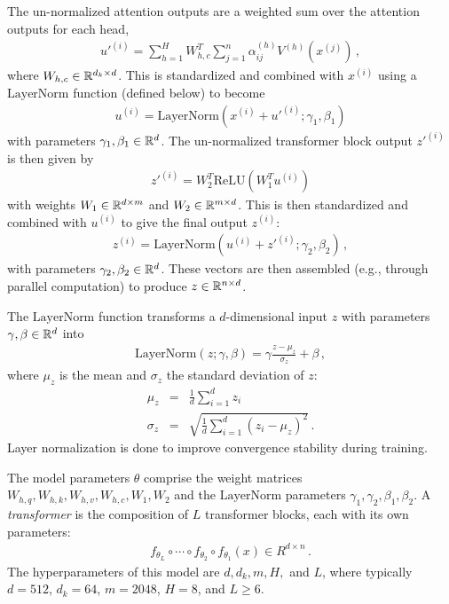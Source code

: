 The un-normalized attention outputs are a weighted sum over the attention outputs for each head,
\begin{eqnarray}
  {u'}^{(i)} = \sum_{h=1}^H W^T_{h,c} \sum_{j=1}^{n} \alpha^{(h)}_{ij} V^{(h)}(x^{(j)})
\,,
\end{eqnarray}
where $W_{h,c} \in \mathbb{R}^{d_k\times d}$.  This is standardized and combined with $x^{(i)}$ using a $\text{LayerNorm}$ function (defined below) to become
\begin{eqnarray}
  {u}^{(i)} = \text{LayerNorm}\left(  x^{(i)} + {u'}^{(i)}; \gamma_1, \beta_1  \right)
\end{eqnarray}
with parameters $\gamma_1, \beta_1 \in \mathbb{R}^{d}$.  The un-normalized transformer block output ${z'}^{(i)}$ is then given by
\begin{eqnarray}
  {z'}^{(i)} = W_2^T \text{ReLU}\left( W_1^T u^{(i)} \right)
\end{eqnarray}
with weights $W_1\in \mathbb{R}^{d\times m}$ and $W_2\in \mathbb{R}^{m\times d}$.  This is then standardized and combined with $u^{(i)}$ to give the final output $z^{(i)}$:
\begin{eqnarray}
  {z}^{(i)} = \text{LayerNorm}\left(  u^{(i)} + {z'}^{(i)}; \gamma_2, \beta_2  \right)
\,,
\end{eqnarray}
with parameters $\gamma_2, \beta_2 \in \mathbb{R}^{d}$.  These vectors are then assembled (e.g., through parallel computation) to produce $z\in \mathbb{R}^{n\times d}$.

The $\text{LayerNorm}$ function transforms a $d$-dimensional input $z$ with parameters $\gamma, \beta \in \mathbb{R}^d$ into
\begin{eqnarray}
  \text{LayerNorm}(z; \gamma, \beta) = \gamma \frac{z-\mu_z}{\sigma_z} + \beta
\,,
\end{eqnarray}
where $\mu_z$ is the mean and $\sigma_z$ the standard deviation of $z$:
\begin{eqnarray}
  \mu_z &=& \frac{1}{d} \sum_{i=1}^d z_i
  \\
  \sigma_z &=& \sqrt{ \frac{1}{d} \sum_{i=1}^d (z_i-\mu_z)^2 }
\,.
\end{eqnarray}
Layer normalization is done to improve convergence stability during training.

The model parameters $\theta$ comprise the weight matrices $W_{h,q}, W_{h,k}, W_{h,v}, W_{h,c}, W_1, W_2$ and the $\text{LayerNorm}$ parameters $\gamma_1, \gamma_2, \beta_1, \beta_2$.  A {\em transformer} is the composition of $L$ transformer blocks, each with its own parameters:
\begin{eqnarray}
  f_{\theta_L} \circ  \cdots \circ f_{\theta_2} \circ f_{\theta_1}(x) \in R^{d\times n}
\,.
\end{eqnarray}
The hyperparameters of this model are $d, d_k, m, H,$ and $L$, where typically $d=512$, $d_k = 64$, $m=2048$, $H=8$, and $L\ge 6$.


